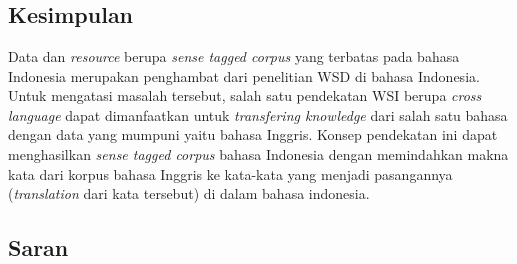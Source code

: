 \chapter{\babEnam}

\section{Kesimpulan}

Data dan \textit{resource} berupa \textit{sense tagged corpus} yang terbatas pada bahasa Indonesia merupakan penghambat dari penelitian WSD di bahasa Indonesia. Untuk mengatasi masalah tersebut, salah satu pendekatan WSI berupa \textit{cross language} dapat dimanfaatkan untuk \textit{transfering knowledge} dari salah satu bahasa dengan data yang mumpuni yaitu bahasa Inggris. Konsep pendekatan ini dapat menghasilkan \textit{sense tagged corpus} bahasa Indonesia dengan memindahkan makna kata dari korpus bahasa Inggris ke kata-kata yang menjadi pasangannya (\textit{translation} dari kata tersebut) di dalam bahasa indonesia.
\section{Saran}
